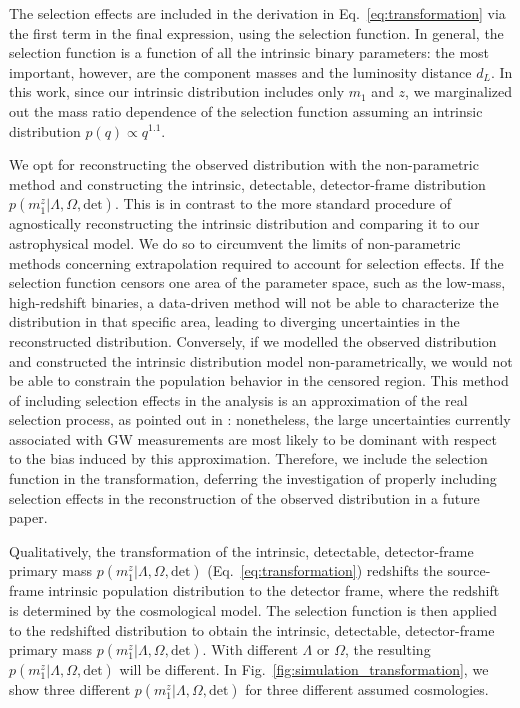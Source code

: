 \documentclass[sn-aps, pdflatex, iicol]{sn-jnl}
\begin{document}
The selection effects are included in the derivation in Eq.~\eqref{eq:transformation} via the first term in the final expression, using the selection function.
In general, the selection function is a function of all the intrinsic binary parameters: the most important, however, are the component masses and the luminosity distance $d_L$.
In this work, since our intrinsic distribution includes only $m_1$ and $z$, we marginalized out the mass ratio dependence of the selection function assuming an intrinsic distribution $p(q) \propto q^{1.1}$.

We opt for reconstructing the observed distribution with the non-parametric method and constructing the intrinsic, detectable, detector-frame distribution $p(m^z_1|\Lambda, \Omega, \mathrm{det})$.
This is in contrast to the more standard procedure of agnostically reconstructing the intrinsic distribution and comparing it to our astrophysical model.
We do so to circumvent the limits of non-parametric methods concerning extrapolation required to account for selection effects.
If the selection function censors one area of the parameter space, such as the low-mass, high-redshift binaries, a data-driven method will not be able to characterize the distribution in that specific area, leading to diverging uncertainties in the reconstructed distribution.
Conversely, if we modelled the observed distribution and constructed the intrinsic distribution model non-parametrically, we would not be able to constrain the population behavior in the censored region.
This method of including selection effects in the analysis is an approximation of the real selection process, as pointed out in \cite{Essick:2023upv}: nonetheless, the large uncertainties currently associated with \ac{GW} measurements are most likely to be dominant with respect to the bias induced by this approximation.
Therefore, we include the selection function in the transformation, deferring the investigation of properly including selection effects in the reconstruction of the observed distribution in a future paper.

Qualitatively, the transformation of the intrinsic, detectable, detector-frame primary mass $p(m^z_1|\Lambda, \Omega, \mathrm{det})$ (Eq.~\eqref{eq:transformation}) redshifts the source-frame intrinsic population distribution to the detector frame, where the redshift is determined by the cosmological model.
The selection function is then applied to the redshifted distribution to obtain the intrinsic, detectable, detector-frame primary mass $p(m^z_1|\Lambda, \Omega, \mathrm{det})$.
With different $\Lambda$ or $\Omega$, the resulting $p(m^z_1|\Lambda, \Omega, \mathrm{det})$ will be different.
In Fig.~\ref{fig:simulation_transformation}, we show three different $p(m^z_1|\Lambda, \Omega, \mathrm{det})$ for three different assumed cosmologies.
\end{document}
